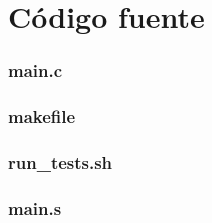 \appendix
\section{Código fuente}\label{appendix_codigo_fuente}

\subsubsection{main.c}\label{app_main}

\clearpage

\subsubsection{makefile}\label{app_makefile}

\clearpage

\subsubsection{run\_tests.sh}\label{app_run_tests}


\subsubsection{main.s}\label{app_main_asm}

\clearpage


